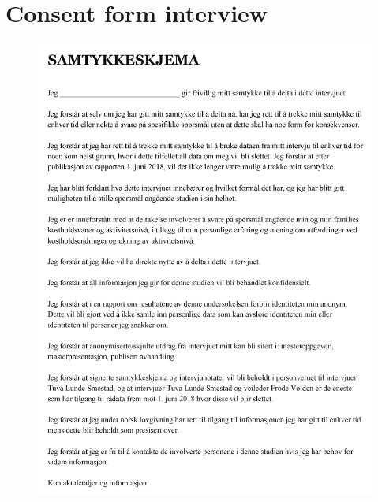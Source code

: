     
\section{Consent form interview}
    \label{consentinterview}
    
  \begin{figure}
        \centering
        \includegraphics[scale=0.8]{figures/samtykkeint1.pdf}
    \end{figure}
